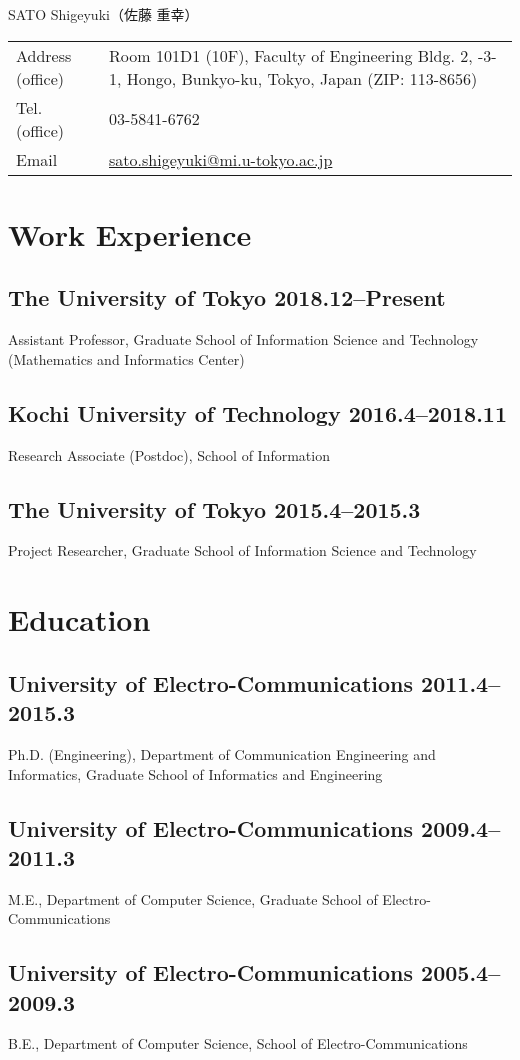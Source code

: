 \documentclass[a4paper,dvipdfmx]{article}
\newcommand{\datedsubsection}[2]{%
  \subsection[#1]{#1 \hfill #2}%
}
\begin{document}
\noindent
{\Huge SATO Shigeyuki{\LARGE（佐藤 重幸）}}
\begin{flushleft}
\begin{tabular}[t]{lp{10cm}}
Address (office) & Room 101D1 (10F), Faculty of Engineering Bldg. 2, \newline 7-3-1, Hongo, Bunkyo-ku, Tokyo, Japan (ZIP: 113-8656) \\
Tel. (office) & 03-5841-6762 \\
Email & \url{sato.shigeyuki@mi.u-tokyo.ac.jp}
\end{tabular}
\end{flushleft}

\section{Work Experience}
\datedsubsection{The University of Tokyo}{2018.12--Present}
%
Assistant Professor, Graduate School of Information Science and
Technology (Mathematics and Informatics Center)

\datedsubsection{Kochi University of Technology}{2016.4--2018.11}
%
Research Associate (Postdoc), School of Information

\datedsubsection{The University of Tokyo}{2015.4--2015.3}
%
Project Researcher, Graduate School of Information Science and
Technology

\section{Education}
\datedsubsection{University of Electro-Communications}{2011.4--2015.3}
Ph.D. (Engineering), Department of Communication Engineering and
Informatics, Graduate School of Informatics and Engineering

\datedsubsection{University of Electro-Communications}{2009.4--2011.3}
M.E., Department of Computer Science, Graduate School of Electro-Communications

\datedsubsection{University of Electro-Communications}{2005.4--2009.3}
B.E., Department of Computer Science, School of Electro-Communications
\end{document}
